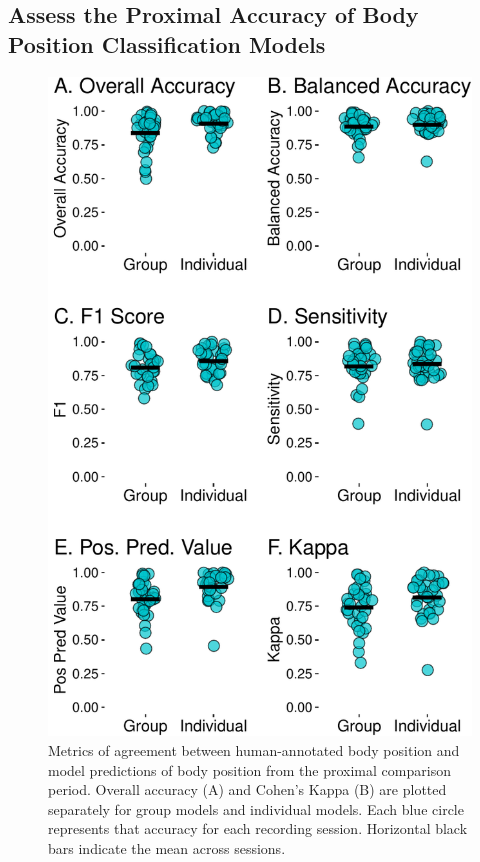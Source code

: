 \documentclass[
  man]{apa6}
\begin{document}
\hypertarget{assess-the-proximal-accuracy-of-body-position-classification-models}{%
\subsection{Assess the Proximal Accuracy of Body Position Classification Models}\label{assess-the-proximal-accuracy-of-body-position-classification-models}}

\begin{figure}

{\centering \includegraphics{manuscript_files/figure-latex/metrics-1} 

}

\caption{Metrics of agreement between human-annotated body position and model predictions of body position from the proximal comparison period. Overall accuracy (A) and Cohen's Kappa (B) are plotted separately for group models and individual models. Each blue circle represents that accuracy for each recording session. Horizontal black bars indicate the mean across sessions.}\label{fig:metrics}
\end{figure}
\end{document}
